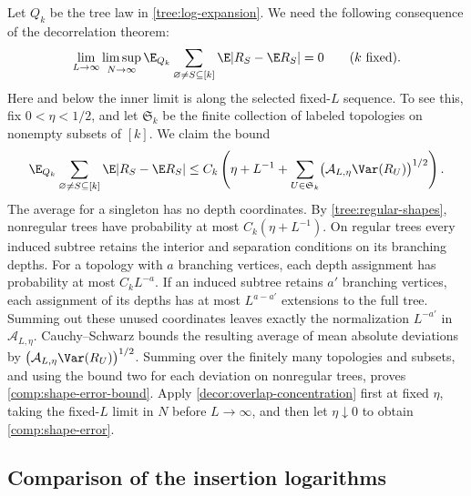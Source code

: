Let $Q_k$ be the tree law in \cref{tree:log-expansion}. We need the following
consequence of the decorrelation theorem:
\begin{equation}\label{comp:shape-error}
 \lim_{L\to\infty}\limsup_{N\to\infty}
 \E_{Q_k}\sum_{\varnothing\ne S\subseteq[k]}
 \E|R_S-\E R_S|=0\qquad(k\text{ fixed}).
\end{equation}
Here and below the inner limit is along the selected fixed-$L$ sequence.
To see this, fix $0<\eta<1/2$, and let $\mathfrak S_k$ be the finite collection
of labeled topologies on nonempty subsets of $[k]$. We claim the bound
\begin{equation}\label{comp:shape-error-bound}
 \E_{Q_k}\sum_{\varnothing\ne S\subseteq[k]}
       \E|R_S-\E R_S|
 \le C_k\left(\eta+L^{-1}
       +\sum_{U\in\mathfrak S_k}
          \bigl(\mathcal A_{L,\eta}\Var(R_U)\bigr)^{1/2}\right).
\end{equation}
The average for a singleton has no depth coordinates.
By \cref{tree:regular-shapes}, nonregular trees
have probability at most $C_k(\eta+L^{-1})$. On regular trees every induced
subtree retains the interior and separation conditions on its branching
depths. For a topology with $a$ branching vertices, each depth assignment
has probability at most $C_kL^{-a}$. If an induced subtree retains $a'$
branching vertices, each assignment of its depths has at most $L^{a-a'}$
extensions to the full tree. Summing out these unused coordinates leaves
exactly the normalization $L^{-a'}$ in $\mathcal A_{L,\eta}$.
Cauchy--Schwarz bounds the resulting average of mean absolute deviations
by $\bigl(\mathcal A_{L,\eta}\Var(R_U)\bigr)^{1/2}$.
Summing over the finitely many topologies and subsets, and using the bound
two for each deviation on nonregular trees, proves
\eqref{comp:shape-error-bound}. Apply \cref{decor:overlap-concentration}
first at fixed $\eta$, taking the fixed-$L$ limit in $N$ before
$L\to\infty$, and then let $\eta\downarrow0$ to obtain
\eqref{comp:shape-error}.

\subsection{Comparison of the insertion logarithms}


